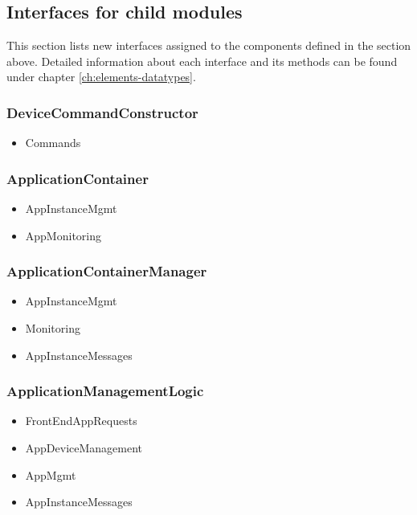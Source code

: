 \subsection{Interfaces for child modules}
    This section lists new interfaces assigned to the components defined
    in the section above. Detailed information about each interface and
    its methods can be found under chapter \ref{ch:elements-datatypes}. \\

    \subsubsection{DeviceCommandConstructor}
        \begin{itemize}
            \item Commands
        \end{itemize}

   \subsubsection{ApplicationContainer}
        \begin{itemize}
            \item AppInstanceMgmt
            \item AppMonitoring
        \end{itemize}

    \subsubsection{ApplicationContainerManager}
        \begin{itemize}
            \item AppInstanceMgmt
            \item Monitoring
            \item AppInstanceMessages
        \end{itemize}
    
    \subsubsection{ApplicationManagementLogic}
        \begin{itemize}
            \item FrontEndAppRequests
            \item AppDeviceManagement
            \item AppMgmt
            \item AppInstanceMessages
        \end{itemize}


